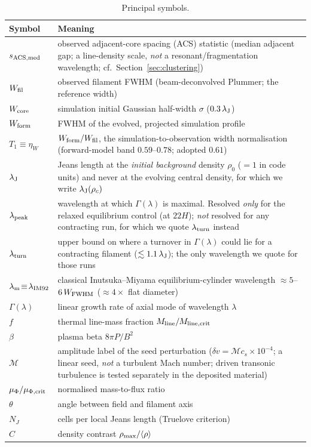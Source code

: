 \documentclass[usenatbib,twoside,twocolumn]{mnras}
\begin{document}
\begin{table}
\caption{Principal symbols.}
\label{tab:symbols}
\footnotesize
\setlength{\tabcolsep}{4pt}
\begin{tabular}{lp{6.1cm}}
\toprule
Symbol & Meaning \\
\midrule
$s_{\rm ACS,med}$ & observed adjacent-core spacing (ACS) statistic (median adjacent gap; a line-density scale, \emph{not} a resonant/fragmentation wavelength; cf.\ Section~\ref{sec:clustering}) \\
$W_{\rm fil}$ & observed filament FWHM (beam-deconvolved Plummer; the reference width) \\
$W_{\rm core}$ & simulation initial Gaussian half-width $\sigma$ ($0.3\,\lambda_{\rm J}$) \\
$W_{\rm form}$ & FWHM of the evolved, projected simulation profile \\
$T_1\!\equiv\!\eta_W$ & $W_{\rm form}/W_{\rm fil}$, the simulation-to-observation width normalisation (forward-model band $0.59$--$0.78$; adopted $0.61$) \\
$\lambda_{\rm J}$ & Jeans length at the \emph{initial background} density $\rho_0$ ($=1$ in code units) and never at the evolving central density, for which we write $\lambda_{\rm J}(\rho_c)$ \\
$\lambda_{\rm peak}$ & wavelength at which $\Gamma(\lambda)$ is maximal. Resolved \emph{only} for the relaxed equilibrium control (at $22H$); \emph{not} resolved for any contracting run, for which we quote $\lambda_{\rm turn}$ instead \\
$\lambda_{\rm turn}$ & upper bound on where a turnover in $\Gamma(\lambda)$ could lie for a contracting filament ($\lesssim1.1\,\lambda_{\rm J}$); the only wavelength we quote for those runs \\
$\lambda_{\rm m}\!\equiv\!\lambda_{\rm IM92}$ & classical Inutsuka--Miyama equilibrium-cylinder wavelength $\approx5$--$6\,W_{\rm FWHM}$ ($\approx4\times$ flat diameter) \\
$\Gamma(\lambda)$ & linear growth rate of axial mode of wavelength $\lambda$ \\
$f$ & thermal line-mass fraction $M_{\rm line}/M_{\rm line,crit}$ \\
$\beta$ & plasma beta $8\pi P/B^2$ \\
$\mathcal{M}$ & amplitude label of the seed perturbation ($\delta v=\mathcal{M}c_s\times10^{-4}$; a linear seed, \emph{not} a turbulent Mach number; driven transonic turbulence is tested separately in the deposited material) \\
$\mu_\Phi/\mu_{\Phi,\rm crit}$ & normalised mass-to-flux ratio \\
$\theta$ & angle between field and filament axis \\
$N_J$ & cells per local Jeans length (Truelove criterion) \\
$C$ & density contrast $\rho_{\rm max}/\langle\rho\rangle$ \\
\bottomrule
\end{tabular}
\end{table}
\end{document}
